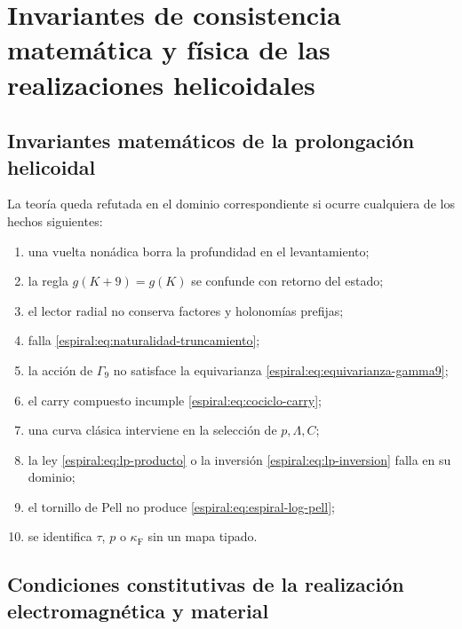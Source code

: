 \chapter{Invariantes de consistencia matemática y física de las realizaciones helicoidales}

\section{Invariantes matemáticos de la prolongación helicoidal}

La teoría queda refutada en el dominio correspondiente si ocurre cualquiera
de los hechos siguientes:
\begin{enumerate}
\item una vuelta nonádica borra la profundidad en el levantamiento;
\item la regla \(g(K+9)=g(K)\) se confunde con retorno del estado;
\item el lector radial no conserva factores y holonomías prefijas;
\item falla \cref{espiral:eq:naturalidad-truncamiento};
\item la acción de \(\Gamma_9\) no satisface la equivarianza
\cref{espiral:eq:equivarianza-gamma9};
\item el carry compuesto incumple \cref{espiral:eq:cociclo-carry};
\item una curva clásica interviene en la selección de \(p,\Lambda,C\);
\item la ley \cref{espiral:eq:lp-producto} o la inversión
\cref{espiral:eq:lp-inversion} falla en su dominio;
\item el tornillo de Pell no produce \cref{espiral:eq:espiral-log-pell};
\item se identifica \(\tau\), \(p\) o \(\kappa_{\mathrm{F}}\) sin un mapa
tipado.
\end{enumerate}

\section{Condiciones constitutivas de la realización electromagnética y material}

